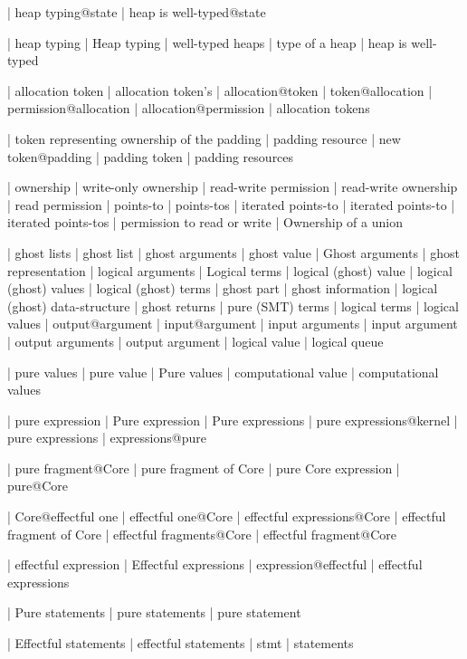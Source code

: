  | heap typing@state
 | heap is well-typed@state

 | heap typing
 | Heap typing
 | well-typed heaps
 | type of a heap
 | heap is well-typed

 | allocation token
 | allocation token's
 | allocation@token
 | token@allocation
 | permission@allocation
 | allocation@permission
 | allocation tokens

 | token representing ownership of the padding
 | padding resource
 | new token@padding
 | padding token
 | padding resources

 | ownership
 | write-only ownership
 | read-write permission
 | read-write ownership
 | read permission
 | points-to
 | points-tos
 | iterated points-to
 | iterated points-to
 | iterated points-tos
 | permission to read or write
 | Ownership of a union

 | ghost lists
 | ghost list
 | ghost arguments
 | ghost value
 | Ghost arguments
 | ghost representation
 | logical arguments
 | Logical terms
 | logical (ghost) value
 | logical (ghost) values
 | logical (ghost) terms
 | ghost part
 | ghost information
 | logical (ghost) data-structure
 | ghost returns
 | pure (SMT) terms
 | logical terms
 | logical values
 | output@argument
 | input@argument
 | input arguments
 | input argument
 | output arguments
 | output argument
 | logical value
 | logical queue

 | pure values
 | pure value
 | Pure values
 | computational value
 | computational values

 | pure expression
 | Pure expression
 | Pure expressions
 | pure expressions@kernel
 | pure expressions
 | expressions@pure

 | pure fragment@Core
 | pure fragment of Core
 | pure Core expression
 | pure@Core

 | Core@effectful one
 | effectful one@Core
 | effectful expressions@Core
 | effectful fragment of Core
 | effectful fragments@Core
 | effectful fragment@Core

 | effectful expression
 | Effectful expressions
 | expression@effectful
 | effectful expressions

 | Pure statements
 | pure statements
 | pure statement

 | Effectful statements
 | effectful statements
 | stmt
 | statements

